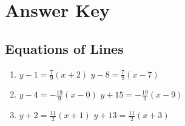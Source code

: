 \newpage

\section{Answer Key}

\subsection*{Equations of Lines}
\begin{enumerate}
\item $y-1 = \frac{7}{9}(x+2)$  $y-8=\frac{7}{9}(x-7)$
    \item $y-4 = -\frac{19}{9}(x-0)$  $y+15=-\frac{19}{9}(x-9)$
    \item $y+2 = \frac{11}{2}(x+1)$  $y+13=\frac{11}{2}(x+3)$
\end{enumerate}

